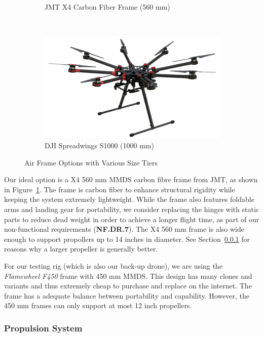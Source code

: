 \begin{figure}[H]
\begin{subfigure}[b]{0.33\textwidth}
        \caption{JMT X4 Carbon Fiber Frame (560 mm)}
        \label{fig:jmtx4}
    \end{subfigure}
    ~
    \begin{subfigure}[b]{0.33\textwidth}
        \centering
        \includegraphics[width=\textwidth]{img/djis1000}
        \caption{DJI Spreadwings S1000 (1000 mm)}
        \label{fig:djis1000}
    \end{subfigure}
    
    \caption{Air Frame Options with Various Size Tiers }
\end{figure}

Our ideal option is a X4 560 mm MMDS carbon fibre frame from JMT, as shown in Figure~\ref{fig:jmtx4}. The frame is carbon fiber to enhance structural rigidity while keeping the system extremely lightweight. While the frame also features foldable arms and landing gear for portability, we consider replacing the hinges with static parts to reduce dead weight in order to achieve a longer flight time, as part of our non-functional requirements (\textbf{NF.DR.7}). The X4 560 mm frame is also wide enough to support propollers up to 14 inches in diameter. See Section~\ref{section:propsys} for reasons why a larger propeller is generally better.

For our testing rig (which is also our back-up drone), we are using the \textit{Flamewheel F450} frame with 450 mm MMDS. This design has many clones and variants and thus extremely cheap to purchase and replace on the internet. The frame has a adequate balance between portability and capability. However, the 450 mm frames can only support at most 12 inch propellers.

\subsubsection{Propulsion System}\label{section:propsys}

